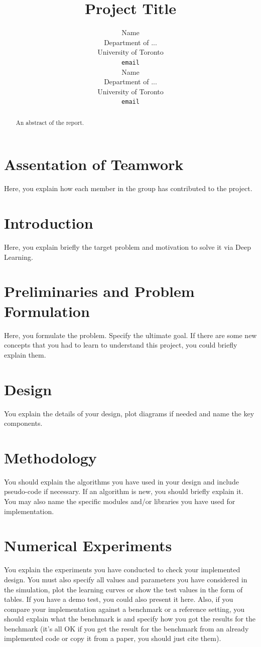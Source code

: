 \documentclass{article}
\title{Project Title}
\author{%
  Name\\
  Department of ...\\
  University of Toronto\\
  \texttt{email} \\
  \And
  Name\\
  Department of ...\\
  University of Toronto\\
  \texttt{email} \\
}
\begin{document}
\maketitle


\begin{abstract}
An abstract of the report.
\end{abstract}

\section*{Assentation of Teamwork}
Here, you explain how each member in the group has contributed to the project. 



\section{Introduction}
Here, you explain briefly the target problem and motivation to solve it via Deep Learning.

\section{Preliminaries and Problem Formulation}
Here, you formulate the problem. Specify the ultimate goal. If there are some new concepts that you had to learn to understand this project, you could briefly explain them. 
	
\section{Design}
You explain the details of your design, plot diagrams if needed and name the key components. 




\section{Methodology}
You should explain the algorithms you have used in your design and include pseudo-code if necessary. If an algorithm is new, you should briefly explain it. You may also name the specific modules and/or libraries you have used for implementation.


\section{Numerical Experiments}

You explain the experiments you have conducted to check your implemented design. You must also specify all values and parameters you have considered in the simulation, plot the learning curves or show the test values in the form of tables. If you have a demo test, you could also present it here. Also, if you compare your implementation against a benchmark or a reference setting, you should explain what the benchmark is and specify how you got the results for the benchmark (it's all OK if you get the result for the benchmark from an already implemented code or copy it from a paper, you should just cite them).
\end{document}
